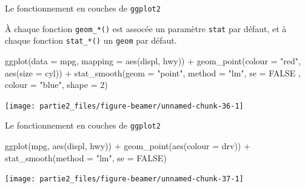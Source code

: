 \documentclass[12pt,ignorenonframetext,]{beamer}
\newenvironment{Shaded}{}{}
\newcommand{\DataTypeTok}[1]{#1}
\newcommand{\DecValTok}[1]{#1}
\newcommand{\KeywordTok}[1]{\textcolor[rgb]{0.00,0.00,1.00}{#1}}
\newcommand{\NormalTok}[1]{#1}
\newcommand{\OperatorTok}[1]{#1}
\newcommand{\OtherTok}[1]{\textcolor[rgb]{1.00,0.25,0.00}{#1}}
\newcommand{\StringTok}[1]{\textcolor[rgb]{0.00,0.50,0.50}{#1}}
\renewenvironment{Shaded}{\begin{snugshade}}{\end{snugshade}}
\begin{document}
\begin{frame}[fragile]{\large Le fonctionnement en \og couches \fg{} de
\texttt{ggplot2}}
\protect\hypertarget{le-fonctionnement-en-couches-de-ggplot2-5}{}

À chaque fonction \texttt{geom\_*()} est assocée un paramètre
\texttt{stat} par défaut, et à chaque fonction \texttt{stat\_*()} un
\texttt{geom} par défaut.

\footnotesize \center

\begin{Shaded}
\begin{Highlighting}[]
\KeywordTok{ggplot}\NormalTok{(}\DataTypeTok{data =}\NormalTok{ mpg, }\DataTypeTok{mapping =} \KeywordTok{aes}\NormalTok{(displ, hwy)) }\OperatorTok{+}\StringTok{ }
\StringTok{  }\KeywordTok{geom_point}\NormalTok{(}\DataTypeTok{colour =} \StringTok{"red"}\NormalTok{, }\KeywordTok{aes}\NormalTok{(}\DataTypeTok{size =}\NormalTok{ cyl)) }\OperatorTok{+}\StringTok{ }
\StringTok{  }\KeywordTok{stat_smooth}\NormalTok{(}\DataTypeTok{geom =} \StringTok{"point"}\NormalTok{, }\DataTypeTok{method =} \StringTok{"lm"}\NormalTok{, }\DataTypeTok{se =} \OtherTok{FALSE}
\NormalTok{    , }\DataTypeTok{colour =} \StringTok{"blue"}\NormalTok{, }\DataTypeTok{shape =} \DecValTok{2}\NormalTok{)}
\end{Highlighting}
\end{Shaded}

\texttt{[image: partie2\_files/figure-beamer/unnamed-chunk-36-1]}

\end{frame}

\begin{frame}[fragile]{\large Le fonctionnement en \og couches \fg{} de
\texttt{ggplot2}}
\protect\hypertarget{le-fonctionnement-en-couches-de-ggplot2-6}{}

\footnotesize \center

\begin{Shaded}
\begin{Highlighting}[]
\KeywordTok{ggplot}\NormalTok{(mpg, }\KeywordTok{aes}\NormalTok{(displ, hwy)) }\OperatorTok{+}\StringTok{ }
\StringTok{  }\KeywordTok{geom_point}\NormalTok{(}\KeywordTok{aes}\NormalTok{(}\DataTypeTok{colour =}\NormalTok{ drv)) }\OperatorTok{+}\StringTok{ }
\StringTok{  }\KeywordTok{stat_smooth}\NormalTok{(}\DataTypeTok{method =} \StringTok{"lm"}\NormalTok{, }\DataTypeTok{se =} \OtherTok{FALSE}\NormalTok{)}
\end{Highlighting}
\end{Shaded}

\texttt{[image: partie2\_files/figure-beamer/unnamed-chunk-37-1]}

\end{frame}
\end{document}

